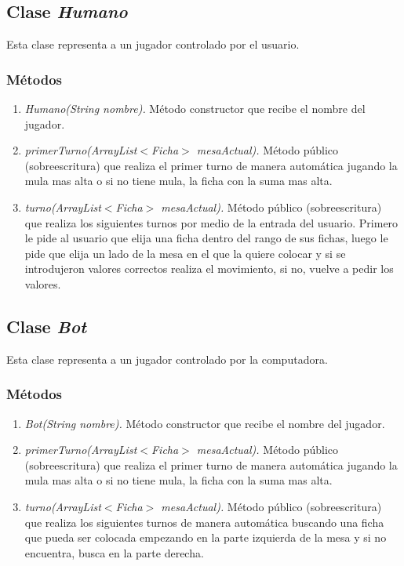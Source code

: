 \documentclass[12pt]{article}
\begin{document}
  \subsection{Clase \textit{Humano}}
  Esta clase representa a un jugador controlado por el usuario.

  \subsubsection{Métodos}
  \begin{enumerate}
    \item \textit{Humano(String nombre).} Método constructor que recibe el nombre del jugador.
    \item \textit{primerTurno(ArrayList$<$Ficha$>$ mesaActual).} Método público (sobreescritura) que realiza el primer turno de manera automática jugando la mula mas alta o si no tiene mula, la ficha con la suma mas alta.
    \item \textit{turno(ArrayList$<$Ficha$>$ mesaActual).} Método público (sobreescritura) que realiza los siguientes turnos por medio de la entrada del usuario. Primero le pide al usuario que elija una ficha dentro del rango de sus fichas, luego le pide que elija un lado de la mesa en el que la quiere colocar y si se introdujeron valores correctos realiza el movimiento, si no, vuelve a pedir los valores.
  \end{enumerate}

  \subsection{Clase \textit{Bot}}
  Esta clase representa a un jugador controlado por la computadora.

  \subsubsection{Métodos}
  \begin{enumerate}
    \item \textit{Bot(String nombre).} Método constructor que recibe el nombre del jugador.
    \item \textit{primerTurno(ArrayList$<$Ficha$>$ mesaActual).} Método público (sobreescritura) que realiza el primer turno de manera automática jugando la mula mas alta o si no tiene mula, la ficha con la suma mas alta.
    \item \textit{turno(ArrayList$<$Ficha$>$ mesaActual).} Método público (sobreescritura) que realiza los siguientes turnos de manera automática buscando una ficha que pueda ser colocada empezando en la parte izquierda de la mesa y si no encuentra, busca en la parte derecha. 
  \end{enumerate}
\end{document}
